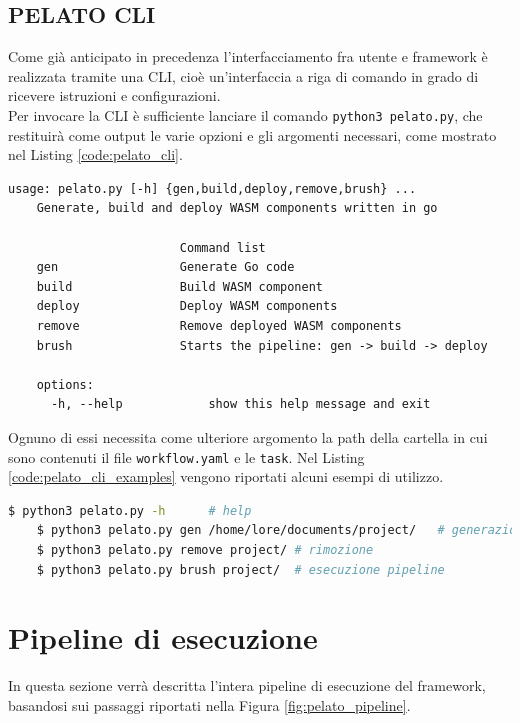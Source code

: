 \subsection{PELATO CLI}

Come già anticipato in precedenza l'interfacciamento fra utente e framework è realizzata tramite una CLI, cioè un'interfaccia a riga di comando in grado di ricevere istruzioni e configurazioni.\\
Per invocare la CLI è sufficiente lanciare il comando \lstinline{python3 pelato.py}, che restituirà come output le varie opzioni e gli argomenti necessari, come mostrato nel Listing \ref{code:pelato_cli}.\\
\begin{lstlisting}[caption={Output Pelato CLI}, captionpos=b, label={code:pelato_cli}]
    usage: pelato.py [-h] {gen,build,deploy,remove,brush} ...
    Generate, build and deploy WASM components written in go
    
                        Command list
    gen                 Generate Go code
    build               Build WASM component
    deploy              Deploy WASM components
    remove              Remove deployed WASM components
    brush               Starts the pipeline: gen -> build -> deploy

    options:
      -h, --help            show this help message and exit
\end{lstlisting}

Ognuno di essi necessita come ulteriore argomento la path della cartella in cui sono contenuti il file \texttt{workflow.yaml} e le \texttt{task}. Nel Listing \ref{code:pelato_cli_examples} vengono riportati alcuni esempi di utilizzo.

\begin{lstlisting}[language=bash, caption={Cheatsheet comandi Pelato CLI}, captionpos=b, label={code:pelato_cli_examples}]
    $ python3 pelato.py -h      # help
    $ python3 pelato.py gen /home/lore/documents/project/   # generazione
    $ python3 pelato.py remove project/ # rimozione
    $ python3 pelato.py brush project/  # esecuzione pipeline
\end{lstlisting}

\section{Pipeline di esecuzione}

In questa sezione verrà descritta l'intera pipeline di esecuzione del framework, basandosi sui passaggi riportati nella Figura \ref{fig:pelato_pipeline}.

